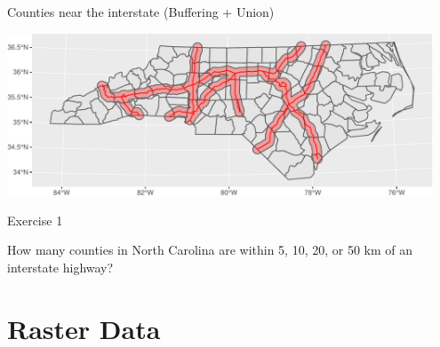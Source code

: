 \documentclass[11pt,ignorenonframetext,]{beamer}
\newenvironment{Shaded}{}{}
\newcommand{\KeywordTok}[1]{\textcolor[rgb]{0.00,0.44,0.13}{\textbf{#1}}}
\newcommand{\DataTypeTok}[1]{\textcolor[rgb]{0.56,0.13,0.00}{#1}}
\newcommand{\DecValTok}[1]{\textcolor[rgb]{0.25,0.63,0.44}{#1}}
\newcommand{\FloatTok}[1]{\textcolor[rgb]{0.25,0.63,0.44}{#1}}
\newcommand{\StringTok}[1]{\textcolor[rgb]{0.25,0.44,0.63}{#1}}
\newcommand{\OperatorTok}[1]{\textcolor[rgb]{0.40,0.40,0.40}{#1}}
\newcommand{\NormalTok}[1]{#1}
\let\oldShaded\Shaded
\let\endoldShaded\endShaded
\renewenvironment{Shaded}{\footnotesize\begin{spacing}{0.9}\oldShaded}{\endoldShaded\end{spacing}}
\let\oldverbatim\verbatim
\let\endoldverbatim\endverbatim
\newcommand{\scriptoutput}{
  \renewenvironment{Shaded}{\scriptsize\begin{spacing}{0.9}\oldShaded}{\endoldShaded\end{spacing}}
  \renewenvironment{verbatim}{\scriptsize\begin{spacing}{0.9}\oldverbatim}{\endoldverbatim\end{spacing}}
}
\begin{document}
\begin{frame}[fragile,t]{Counties near the interstate (Buffering +
Union)}

\scriptoutput

\begin{Shaded}
\end{Shaded}

\begin{center}\includegraphics[width=0.95\textwidth]{Lec17_files/figure-beamer/unnamed-chunk-30-1} \end{center}

\end{frame}

\begin{frame}[t]{Exercise 1}

How many counties in North Carolina are within 5, 10, 20, or 50 km of an
interstate highway?

\end{frame}

\section{Raster Data}\label{raster-data}
\end{document}

